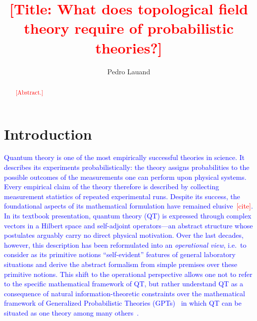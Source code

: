 \documentclass[prl,aps,reprint,twocolumn,10pt,superscriptaddress,floatfix]{revtex4-2}
\newcommand{\tmp}[1]{\textcolor{red}{#1}}
\begin{document}
\title{\tmp{[Title: What does topological field theory require of probabilistic theories?]}}

\author{Pedro Lauand}

\begin{abstract}
\tmp{[Abstract.]}
\end{abstract}

\maketitle

\section{Introduction}


\textcolor{blue}{Quantum theory is one of the most empirically successful
theories in science. It describes its experiments probabilistically: the
theory assigns probabilities to the possible outcomes of the measurements one
can perform upon physical systems. Every empirical claim of the theory
therefore is described by collecting measurement statistics of repeated
experimental runs. Despite its success, the foundational aspects of its
mathematical formulation have remained elusive~\tmp{[cite]}. In its textbook
presentation, quantum theory (QT) is expressed through complex vectors in a
Hilbert space and self-adjoint operators---an abstract structure whose
postulates arguably carry no direct physical motivation. Over the last
decades, however, this description has been reformulated into an
\emph{operational view}, i.e.\ to consider as its primitive notions
``self-evident'' features of general laboratory situations and derive the
abstract formalism from simple premises over these primitive notions. This
shift to the operational perspective allows one not to refer to the specific
mathematical framework of QT, but rather understand QT as a consequence of
natural information-theoretic constraints over the mathematical framework of
Generalized Probabilistic Theories (GPTs)~\cite{Barrett2007, Muller2021,
Plavala2023} in which QT can be situated as one theory among many
others~\cite{Hardy2001, CDP2011, MasanesMuller2011}.}
\end{document}
